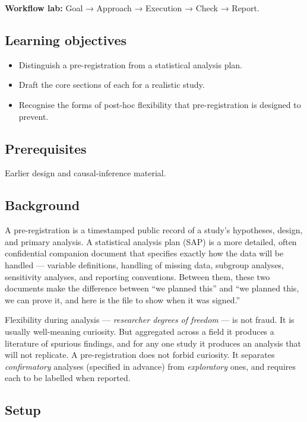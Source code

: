\documentclass[
]{article}
\author{}
\date{\vspace{-2.5em}}
\providecommand{\tightlist}{%
  \setlength{\itemsep}{0pt}\setlength{\parskip}{0pt}}
\begin{document}
\textbf{Workflow lab:} Goal → Approach → Execution → Check → Report.

\subsection{Learning objectives}\label{learning-objectives}

\begin{itemize}
\tightlist
\item
  Distinguish a pre-registration from a statistical analysis plan.
\item
  Draft the core sections of each for a realistic study.
\item
  Recognise the forms of post-hoc flexibility that pre-registration is
  designed to prevent.
\end{itemize}

\subsection{Prerequisites}\label{prerequisites}

Earlier design and causal-inference material.

\subsection{Background}\label{background}

A pre-registration is a timestamped public record of a study's
hypotheses, design, and primary analysis. A statistical analysis plan
(SAP) is a more detailed, often confidential companion document that
specifies exactly how the data will be handled --- variable definitions,
handling of missing data, subgroup analyses, sensitivity analyses, and
reporting conventions. Between them, these two documents make the
difference between ``we planned this'' and ``we planned this, we can
prove it, and here is the file to show when it was signed.''

Flexibility during analysis --- \emph{researcher degrees of freedom} ---
is not fraud. It is usually well-meaning curiosity. But aggregated
across a field it produces a literature of spurious findings, and for
any one study it produces an analysis that will not replicate. A
pre-registration does not forbid curiosity. It separates
\emph{confirmatory} analyses (specified in advance) from
\emph{exploratory} ones, and requires each to be labelled when reported.

\subsection{Setup}\label{setup}
\end{document}
